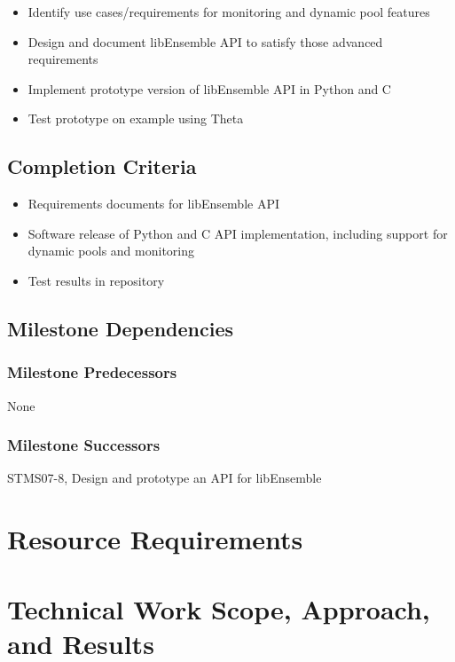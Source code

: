 \documentclass{ecpreport}
\begin{document}
\begin{itemize}
\item Identify use cases/requirements for monitoring and dynamic pool features
\item Design and document libEnsemble API to satisfy those advanced 
requirements
\item Implement prototype version of libEnsemble API in Python and C
\item Test prototype on example using Theta
\end{itemize}

\subsection{Completion Criteria}

\begin{itemize}
\item Requirements documents for libEnsemble API
\item Software release of Python and C API implementation, including support 
for dynamic pools and monitoring
\item Test results in repository
\end{itemize}

\subsection{Milestone Dependencies}
\subsubsection{Milestone Predecessors}

None

\subsubsection{Milestone Successors}

STMS07-8, Design and prototype an API for libEnsemble

\section{Resource Requirements}


\section{Technical Work Scope, Approach, and Results}
\end{document}
